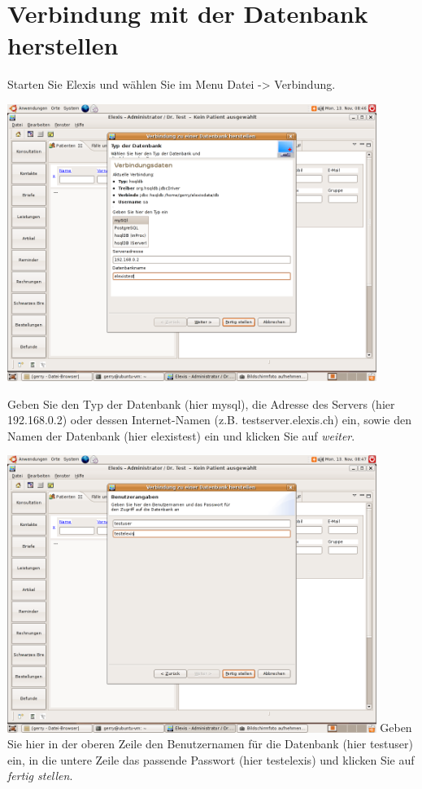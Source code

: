 \section{Verbindung mit der Datenbank herstellen}
\label{connect}
Starten Sie Elexis und wählen Sie im Menu Datei -> Verbindung.

\includegraphics[width=0.9\textwidth]{images/verbindung11.png}



Geben Sie den Typ der Datenbank (hier mysql), die Adresse des Servers (hier 192.168.0.2) oder dessen Internet-Namen 
(z.B. testserver.elexis.ch) ein, sowie den Namen der Datenbank (hier  elexistest) ein und klicken Sie auf 
\textit{weiter}.

\includegraphics[width=0.9\textwidth]{images/verbindung12.png}
Geben Sie hier in der oberen Zeile den Benutzernamen für die Datenbank (hier testuser) ein, in die untere Zeile das passende Passwort (hier testelexis) und klicken Sie auf \textit{fertig stellen}.


